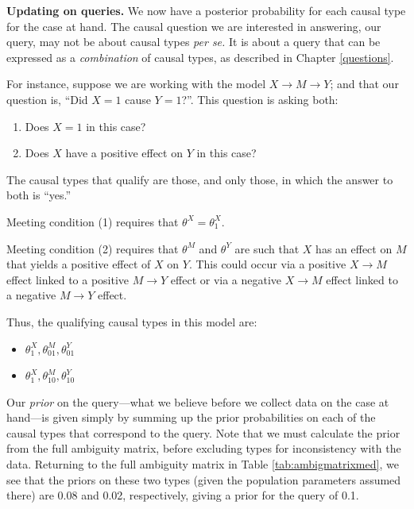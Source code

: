 \documentclass[
  12pt,
]{book}
\providecommand{\tightlist}{%
  \setlength{\itemsep}{0pt}\setlength{\parskip}{0pt}}
\begin{document}
\textbf{Updating on queries.} We now have a posterior probability for each causal type for the case at hand. The causal question we are interested in answering, our query, may not be about causal types \emph{per se.} It is about a query that can be expressed as a \emph{combination} of causal types, as described in Chapter \ref{questions}.

For instance, suppose we are working with the model \(X \rightarrow M \rightarrow Y\); and that our question is, ``Did \(X=1\) cause \(Y=1\)?''. This question is asking both:

\begin{enumerate}
\def\labelenumi{\arabic{enumi}.}
\item
  Does \(X=1\) in this case?
\item
  Does \(X\) have a positive effect on \(Y\) in this case?
\end{enumerate}

The causal types that qualify are those, and only those, in which the answer to both is ``yes.''

Meeting condition (1) requires that \(\theta^X=\theta^X_1\).

Meeting condition (2) requires that \(\theta^M\) and \(\theta^Y\) are such that \(X\) has an effect on \(M\) that yields a positive effect of \(X\) on \(Y\). This could occur via a positive \(X \rightarrow M\) effect linked to a positive \(M \rightarrow Y\) effect or via a negative \(X \rightarrow M\) effect linked to a negative \(M \rightarrow Y\) effect.

Thus, the qualifying causal types in this model are:

\begin{itemize}
\tightlist
\item
  \(\theta^X_1, \theta^M_{01}, \theta^Y_{01}\)
\item
  \(\theta^X_1, \theta^M_{10}, \theta^Y_{10}\)
\end{itemize}

Our \emph{prior} on the query---what we believe before we collect data on the case at hand---is given simply by summing up the prior probabilities on each of the causal types that correspond to the query. Note that we must calculate the prior from the full ambiguity matrix, before excluding types for inconsistency with the data. Returning to the full ambiguity matrix in Table \ref{tab:ambigmatrixmed}, we see that the priors on these two types (given the population parameters assumed there) are 0.08 and 0.02, respectively, giving a prior for the query of 0.1.
\end{document}
